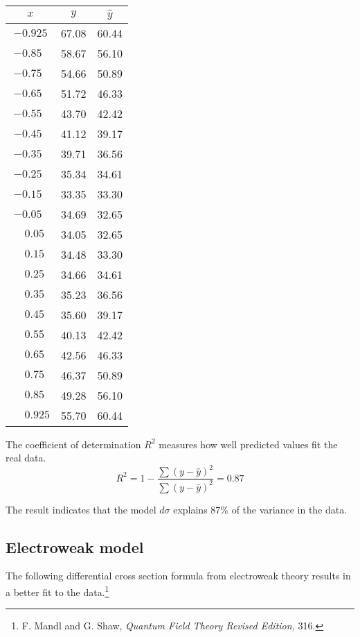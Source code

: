 \documentclass[12pt]{article}
\begin{document}
\begin{center}
\begin{tabular}{|c|c|c|}
\hline
$x$ & $y$ & $\hat{y}$ \\
\hline
$-0.925$ & 67.08 & 60.44\\
$-0.85\phantom{0}$ & 58.67 & 56.10\\
$-0.75\phantom{0}$ & 54.66 & 50.89\\
$-0.65\phantom{0}$ & 51.72 & 46.33\\
$-0.55\phantom{0}$ & 43.70 & 42.42\\
$-0.45\phantom{0}$ & 41.12 & 39.17\\
$-0.35\phantom{0}$ & 39.71 & 36.56\\
$-0.25\phantom{0}$ & 35.34 & 34.61\\
$-0.15\phantom{0}$ & 33.35 & 33.30\\
$-0.05\phantom{0}$ & 34.69 & 32.65\\
$\phantom{+}0.05\phantom{0}$ & 34.05 & 32.65\\
$\phantom{+}0.15\phantom{0}$ & 34.48 & 33.30\\
$\phantom{+}0.25\phantom{0}$ & 34.66 & 34.61\\
$\phantom{+}0.35\phantom{0}$ & 35.23 & 36.56\\
$\phantom{+}0.45\phantom{0}$ & 35.60 & 39.17\\
$\phantom{+}0.55\phantom{0}$ & 40.13 & 42.42\\
$\phantom{+}0.65\phantom{0}$ & 42.56 & 46.33\\
$\phantom{+}0.75\phantom{0}$ & 46.37 & 50.89\\
$\phantom{+}0.85\phantom{0}$ & 49.28 & 56.10\\
$\phantom{+}0.925$ & 55.70 & 60.44\\
\hline
\end{tabular}
\end{center}

\noindent
The coefficient of determination $R^2$ measures how well predicted values fit the real data.
\begin{equation*}
R^2=1-\frac{\sum(y-\hat{y})^2}{\sum(y-\bar{y})^2}=0.87
\end{equation*}

\noindent
The result indicates that the model $d\sigma$ explains 87\% of the variance in the data.

\subsection*{Electroweak model}
The following differential cross section formula from electroweak
theory results in a better fit to the
data.\footnote{F. Mandl and G. Shaw, {\it Quantum Field Theory Revised Edition,} 316.}
\end{document}
